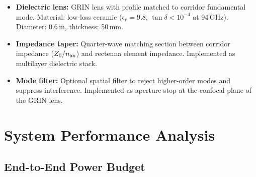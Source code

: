 \documentclass[11pt,a4paper]{article}
\begin{document}
\begin{itemize}
\item \textbf{Dielectric lens:} GRIN lens with profile matched to
corridor fundamental mode. Material: low-loss ceramic
($\epsilon_r = 9.8$, $\tan\delta < 10^{-4}$ at 94\,GHz). Diameter:
0.6\,m, thickness: 50\,mm.

\item \textbf{Impedance taper:} Quarter-wave matching section between
corridor impedance ($Z_0/n_{\rm ax}$) and rectenna element impedance.
Implemented as multilayer dielectric stack.

\item \textbf{Mode filter:} Optional spatial filter to reject
higher-order modes and suppress interference. Implemented as
aperture stop at the confocal plane of the GRIN lens.
\end{itemize}

\section{System Performance Analysis}

\subsection{End-to-End Power Budget}
\end{document}
